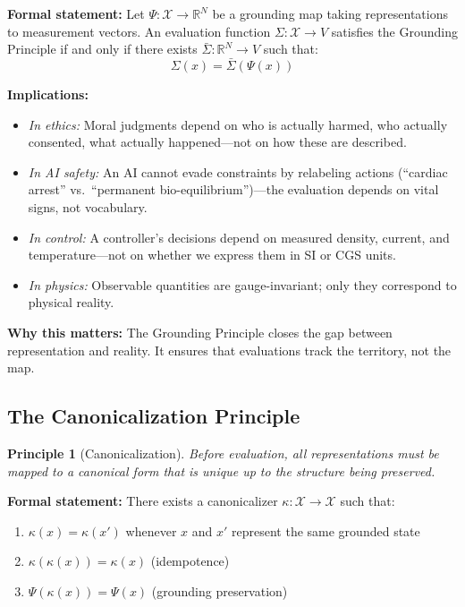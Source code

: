 \documentclass[12pt]{article}
\newtheorem{principle}{Principle}
\begin{document}
\textbf{Formal statement:} Let $\Psi : \mathcal{X} \to \mathbb{R}^N$ be a grounding map taking representations to measurement vectors. An evaluation function $\Sigma : \mathcal{X} \to V$ satisfies the Grounding Principle if and only if there exists $\bar{\Sigma} : \mathbb{R}^N \to V$ such that:
\[
\Sigma(x) = \bar{\Sigma}(\Psi(x))
\]

\textbf{Implications:}
\begin{itemize}
    \item \textit{In ethics:} Moral judgments depend on who is actually harmed, who actually consented, what actually happened---not on how these are described.

    \item \textit{In AI safety:} An AI cannot evade constraints by relabeling actions (``cardiac arrest'' vs.\ ``permanent bio-equilibrium'')---the evaluation depends on vital signs, not vocabulary.

    \item \textit{In control:} A controller's decisions depend on measured density, current, and temperature---not on whether we express them in SI or CGS units.

    \item \textit{In physics:} Observable quantities are gauge-invariant; only they correspond to physical reality.
\end{itemize}

\textbf{Why this matters:} The Grounding Principle closes the gap between representation and reality. It ensures that evaluations track the territory, not the map.

\subsection{The Canonicalization Principle}

\begin{principle}[Canonicalization]
\textit{Before evaluation, all representations must be mapped to a canonical form that is unique up to the structure being preserved.}
\end{principle}

\textbf{Formal statement:} There exists a canonicalizer $\kappa : \mathcal{X} \to \mathcal{X}$ such that:

\begin{enumerate}[label=(\roman*)]
    \item $\kappa(x) = \kappa(x')$ whenever $x$ and $x'$ represent the same grounded state
    \item $\kappa(\kappa(x)) = \kappa(x)$ (idempotence)
    \item $\Psi(\kappa(x)) = \Psi(x)$ (grounding preservation)
\end{enumerate}
\end{document}
